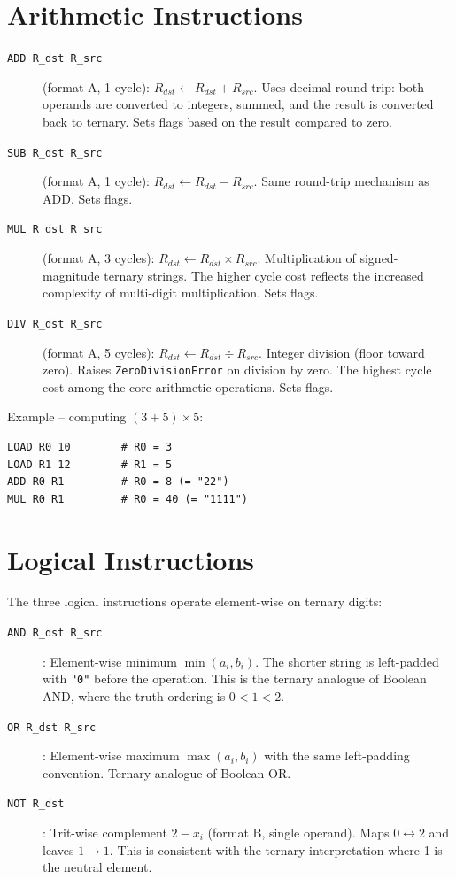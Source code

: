 \documentclass[10pt,a4paper,twoside]{book}
\begin{document}
\section{Arithmetic Instructions}

\begin{description}
    \item[\texttt{ADD R\_dst R\_src}] (format A, 1 cycle): $R_{dst} \gets
          R_{dst} + R_{src}$. Uses decimal round-trip: both operands are converted
          to integers, summed, and the result is converted back to ternary.
          Sets flags based on the result compared to zero.
    \item[\texttt{SUB R\_dst R\_src}] (format A, 1 cycle): $R_{dst} \gets
          R_{dst} - R_{src}$. Same round-trip mechanism as ADD. Sets flags.
    \item[\texttt{MUL R\_dst R\_src}] (format A, 3 cycles): $R_{dst} \gets
          R_{dst} \times R_{src}$. Multiplication of signed-magnitude ternary strings.
          The higher cycle cost reflects the increased complexity of multi-digit
          multiplication. Sets flags.
    \item[\texttt{DIV R\_dst R\_src}] (format A, 5 cycles): $R_{dst} \gets
          R_{dst} \div R_{src}$. Integer division (floor toward zero). Raises
          \texttt{ZeroDivisionError} on division by zero. The highest cycle cost
          among the core arithmetic operations. Sets flags.
\end{description}

Example -- computing $(3 + 5) \times 5$:
\begin{lstlisting}
LOAD R0 10        # R0 = 3
LOAD R1 12        # R1 = 5
ADD R0 R1         # R0 = 8 (= "22")
MUL R0 R1         # R0 = 40 (= "1111")
\end{lstlisting}

\section{Logical Instructions}

The three logical instructions operate element-wise on ternary digits:

\begin{description}
    \item[\texttt{AND R\_dst R\_src}]: Element-wise minimum $\min(a_i, b_i)$. The
          shorter string is left-padded with \texttt{"0"} before the operation.
          This is the ternary analogue of Boolean AND, where the truth ordering is
          $0 < 1 < 2$.
    \item[\texttt{OR R\_dst R\_src}]: Element-wise maximum $\max(a_i, b_i)$ with
          the same left-padding convention. Ternary analogue of Boolean OR.
    \item[\texttt{NOT R\_dst}]: Trit-wise complement $2 - x_i$ (format B, single
          operand). Maps $0 \leftrightarrow 2$ and leaves $1 \rightarrow 1$.
          This is consistent with the ternary interpretation where 1 is the neutral
          element.
\end{description}
\end{document}
